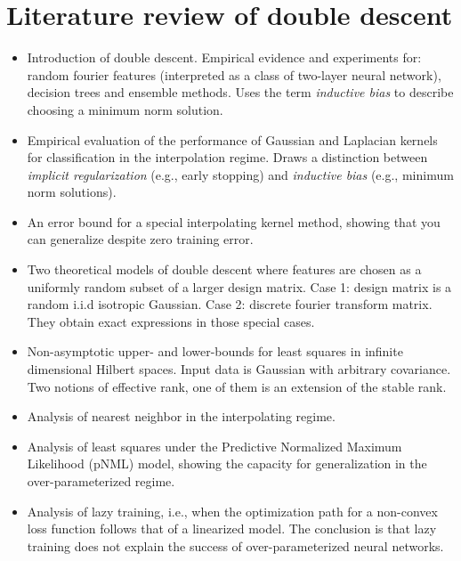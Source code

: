 \documentclass[11pt]{article}
\begin{document}
  \section{Literature review of double descent}
  \begin{itemize}
\item \cite{BHMM19} Introduction of double descent. Empirical evidence and
experiments for: random fourier features (interpreted as a class of
two-layer neural network), decision trees and ensemble
methods. Uses the term \emph{inductive bias} to describe choosing a
minimum norm solution.

\item\cite{BMM18_TR}
Empirical evaluation of the performance of Gaussian and Laplacian
kernels for classification in the interpolation regime. Draws a distinction between
\emph{implicit regularization} (e.g., early stopping) and
\emph{inductive bias} (e.g., minimum norm solutions).

\item\cite{BRT18_TR}
An error bound for a special interpolating kernel
method, showing that you can generalize despite zero training error.

\item\cite{belkin2019two} Two theoretical models of double
  descent where features are chosen as a uniformly random subset of a
  larger design matrix. Case 1: design matrix is a random i.i.d
  isotropic Gaussian. Case 2: discrete fourier transform matrix. They
  obtain exact expressions in those special cases.

\item \cite{BLLT19_TR} Non-asymptotic upper- and lower-bounds for
  least squares in infinite dimensional Hilbert spaces. Input data is
  Gaussian with arbitrary covariance. Two notions of
 effective rank, one of them is an extension of the stable rank.


\item \cite{BHM18_TR} Analysis of nearest neighbor in the
   interpolating regime.

 \item \cite{BFF19_TR} Analysis of least squares
   under the Predictive Normalized Maximum Likelihood (pNML) model,
   showing the capacity for generalization in the over-parameterized
   regime.
 \item \cite{COB18_TR} Analysis of lazy training, i.e., when the
   optimization path for a non-convex loss function follows
   that of a linearized model. The conclusion is that lazy training
   does not explain the success of over-parameterized neural networks.


\end{itemize}
\end{document}
